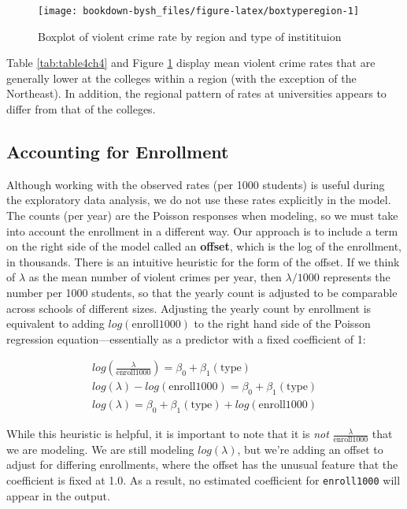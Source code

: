 \documentclass[
]{krantz}
\begin{document}
\begin{figure}

{\centering \texttt{[image: bookdown-bysh\_files/figure-latex/boxtyperegion-1]} 

}

\caption{Boxplot of violent crime rate by region and type of institituion}\label{fig:boxtyperegion}
\end{figure}

Table \ref{tab:table4ch4} and Figure \ref{fig:boxtyperegion} display mean violent crime rates that are generally lower at the colleges within a region (with the exception of the Northeast). In addition, the regional pattern of rates at universities appears to differ from that of the colleges.

\hypertarget{accounting-for-enrollment}{%
\subsection{Accounting for Enrollment}\label{accounting-for-enrollment}}

Although working with the observed rates (per 1000 students) is useful during the exploratory data analysis, we do not use these rates explicitly in the model. The counts (per year) are the Poisson responses when modeling, so we must take into account the enrollment in a different way. Our approach is to include a term on the right side of the model called an \textbf{offset}, which is the log of the enrollment, in thousands. There is an intuitive heuristic for the form of the offset. If we think of \(\lambda\) as the mean number of violent crimes per year, then \(\lambda/1000\) represents the number per 1000 students, so that the yearly count is adjusted to be comparable across schools of different sizes. Adjusting the yearly count by enrollment is equivalent to adding \(log(\textrm{enroll1000})\) to the right hand side of the Poisson regression equation---essentially as a predictor with a fixed coefficient of 1:

\begin{align} 
log(\frac{\lambda}{\textrm{enroll1000}} )= \beta_0 + \beta_1(\textrm{type}) \nonumber \\
log(\lambda)-log(\textrm{enroll1000}) = \beta_0 + \beta_1(\textrm{type}) \nonumber \\
log(\lambda) = \beta_0 + \beta_1(\textrm{type}) + log(\textrm{enroll1000})
\end{align}

While this heuristic is helpful, it is important to note that it is \emph{not} \(\frac{\lambda}{ \textrm{enroll1000}}\) that we are modeling. We are still modeling \(log(\lambda)\), but we're adding an offset to adjust for differing enrollments, where the offset has the unusual feature that the coefficient is fixed at 1.0. As a result, no estimated coefficient for \texttt{enroll1000} will appear in the output.
\end{document}
